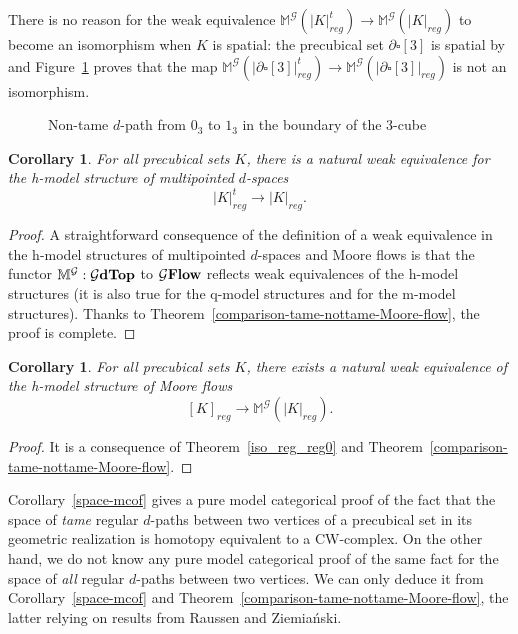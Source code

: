 \documentclass[a4paper,12pt]{amsart}
\newcommand{\de}{\partial}
\newtheorem{cor}[thm]{Corollary}
\newcommand{\bpf}{\begin{proof}}
\newcommand{\epf}{\end{proof}}
\theoremstyle{definition}
\newcommand{\ptop}[1]{{\brm{{#1}dTop}}}
\newcommand{\moore}{{\mathbb{M}}}
\newcommand{\brm}[1]{{\rm{\mathbf{#1}}}}
\newcommand{\dtopG}{{\mathcal{G}\brm{Flow}}}
\begin{document}
There is no reason for the weak equivalence $\moore^{\mathcal{G}}(|K|^t_{reg}) \to \moore^{\mathcal{G}}(|K|_{reg})$ to become an isomorphism when $K$ is spatial: the precubical set $\de\square[3]$ is spatial by \cite[Corollary~A.3]{NaturalRealization} and Figure~\ref{nontame} proves that the map $\moore^{\mathcal{G}}(|\de\square[3]|^t_{reg}) \to \moore^{\mathcal{G}}(|\de\square[3]|_{reg})$ is not an isomorphism.

\begin{figure}
	\caption{Non-tame $d$-path from $0_3$ to $1_3$ in the boundary of the $3$-cube}
	\label{nontame}
\end{figure}


\begin{cor} \label{comparison-tame-nottame-Moore-flow-dspace}
For all precubical sets $K$, there is a natural weak equivalence for the h-model structure of multipointed $d$-spaces 
\[
|K|^t_{reg} \longrightarrow |K|_{reg}.
\]
\end{cor}

\bpf
A straightforward consequence of the definition of a weak equivalence in the h-model structures of multipointed $d$-spaces and Moore flows is that the functor $\moore^{\mathcal{G}}:\ptop{\mathcal{G}}$ to $\dtopG$ reflects weak equivalences of the h-model structures (it is also true for the q-model structures and for the m-model structures). Thanks to Theorem~\ref{comparison-tame-nottame-Moore-flow}, the proof is complete.
\epf


\begin{cor} \label{reg_weak}
	For all precubical sets $K$, there exists a natural weak equivalence of the h-model structure of Moore flows 
	\[
	[K]_{reg} \longrightarrow \moore^{\mathcal{G}}(|K|_{reg}).
	\]
\end{cor}

\bpf
It is a consequence of Theorem~\ref{iso_reg_reg0} and Theorem~\ref{comparison-tame-nottame-Moore-flow}.
\epf

Corollary~\ref{space-mcof} gives a pure model categorical proof of the fact that the space of \textit{tame} regular $d$-paths between two vertices of a precubical set in its geometric realization is homotopy equivalent to a CW-complex. On the other hand, we do not know any pure model categorical proof of the same fact for the space of \textit{all} regular $d$-paths between two vertices. We can only deduce it from Corollary~\ref{space-mcof} and Theorem~\ref{comparison-tame-nottame-Moore-flow}, the latter relying on results from Raussen and Ziemia{\'{n}}ski. 
\end{document}
